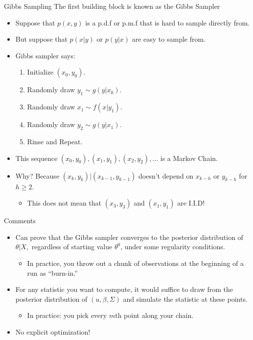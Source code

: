 \documentclass[aspectratio=169]{beamer}
\begin{document}
\begin{frame}{Gibbs Sampling}
The first building block is known as the \alert{Gibbs Sampler}
\begin{itemize}
\item Suppose that $p(x,y)$ is a p.d.f or p.m.f that is hard to sample directly from.
\item But suppose that $p(x | y)$ or $p(y | x)$ are easy to sample from.
\item Gibbs sampler says:
\begin{enumerate}
\item Initialize $(x_0,y_0)$.
\item Randomly draw $y_1 \sim g(y | x_0)$.
\item Randomly draw $x_1 \sim f(x | y_1)$.
\item Randomly draw $y_2 \sim g(y | x_1)$.
\item Rinse and Repeat. 
\end{enumerate}
\item This sequence $(x_0,y_0),(x_1,y_1), (x_2,y_2), \ldots$ is a \alert{Markov Chain}.
\item Why? Because $(x_k,y_k) | (x_{k-1},y_{k-1})$ doesn't depend on $x_{k-h}$ or $y_{k-h}$ for $h \geq 2$.
\begin{itemize}
\item This does not mean that $(x_3,y_3)$ and $(x_1,y_1)$ are I.I.D!
\end{itemize}
\end{itemize}
\end{frame}

\begin{frame}{Comments}
\begin{itemize}
\item Can prove that the Gibbs sampler converges to the posterior distribution
of $\theta|X,$ regardless of starting value $\theta^{0}$, under
some regularity conditions.
\begin{itemize}
\item In practice, you throw out a chunk of observations at the beginning
of a run as ``burn-in.''
\end{itemize}
\item For any statistic you want to compute, it would suffice to draw from
the posterior distribution of $\left(u,\beta,\Sigma\right)$ and simulate
the statistic at these points.

\begin{itemize}
\item In practice: you pick every $m$th point along your chain.
\end{itemize}
\item No explicit optimization!
\end{itemize}
\end{frame}
\end{document}
